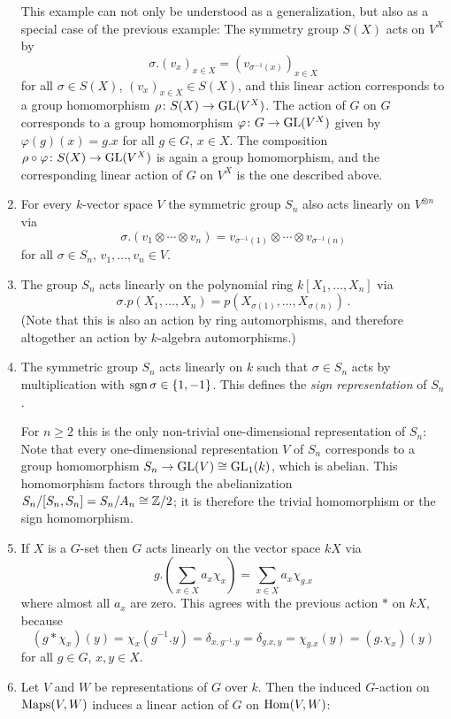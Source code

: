 \begin{example}
\begin{enumerate}
      This example can not only be understood as a generalization, but also as a special case of the previous example:
      The symmetry group $S(X)$ acts on $V^X$ by
      \[
          \sigma . (v_x)_{x \in X}
        = (v_{\sigma^{-1}(x)})_{x \in X}
      \]
      for all $\sigma \in S(X)$, $(v_x)_{x \in X} \in S(X)$, and this linear action corresponds to a group homomorphism $\rho \colon S(X) \to \operatorname{GL}(V^X)$.
      The action of $G$ on $G$ corresponds to a group homomorphism $\varphi \colon G \to \operatorname{GL}(V^X)$ given by $\varphi(g)(x) = g.x$ for all $g \in G$, $x \in X$.
      The composition $\rho \circ \varphi \colon S(X) \to \operatorname{GL}(V^X)$ is again a group homomorphism, and the corresponding linear action of $G$ on $V^X$ is the one described above.
    \item
      For every $k$-vector space $V$ the symmetric group $S_n$ also acts linearly on $V^{\otimes n}$ via
      \[
          \sigma.(v_1 \otimes \dotsb \otimes v_n)
        = v_{\sigma^{-1}(1)} \otimes \dotsb \otimes v_{\sigma^{-1}(n)}
      \]
      for all $\sigma \in S_n$, $v_1, \dotsc, v_n \in V$.
    \item
      The group $S_n$ acts linearly on the polynomial ring $k[X_1, \dotsc, X_n]$ via
      \[
          \sigma.p(X_1, \dotsc, X_n)
        = p(X_{\sigma(1)}, \dotsc, X_{\sigma(n)}) \,.
      \]
      (Note that this is also an action by ring automorphisms, and therefore altogether an action by $k$-algebra automorphisms.)
    \item
      The symmetric group $S_n$ acts linearly on $k$ such that $\sigma \in S_n$ acts by multiplication with $\operatorname{sgn} \sigma \in \{1, -1\}$.
      This defines the \emph{sign representation} of $S_n$.
      
      For $n \geq 2$ this is the only non-trivial one-dimensional representation of $S_n$:
      Note that every one-dimensional representation $V$ of $S_n$ corresponds to a group homomorphism $S_n \to \operatorname{GL}(V) \cong \operatorname{GL}_1(k)$, which is abelian.
      This homomorphism factors through the abelianization $S_n/[S_n, S_n] = S_n/A_n \cong \mathbb{Z}/2$; it is therefore the trivial homomorphism or the sign homomorphism.
    \item
      If $X$ is a $G$-set then $G$ acts linearly on the vector space $kX$ via
      \[
          g.\left(\sum_{x \in X} a_x \chi_x\right)
        = \sum_{x \in X} a_x \chi_{g.x}
      \]
      where almost all $a_x$ are zero.
      This agrees with the previous action $*$ on $kX$, because
      \[
          (g * \chi_x)(y)
        = \chi_x(g^{-1}.y)
        = \delta_{x, g^{-1}.y}
        = \delta_{g.x, y}
        = \chi_{g.x}(y)
        = (g.\chi_x)(y)
      \]
      for all $g \in G$, $x, y \in X$.
    \item
      Let $V$ and $W$ be representations of $G$ over $k$.
      Then the induced $G$-action on $\operatorname{Maps}(V,W)$ induces a linear action of $G$ on $\operatorname{Hom}(V,W)$:
      

\end{enumerate}
\end{example}
